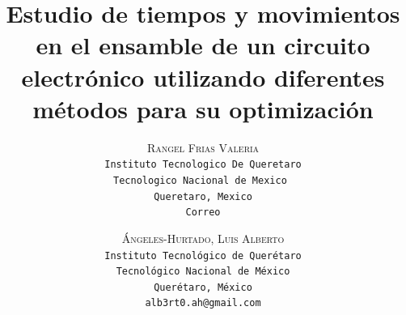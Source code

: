     \lfoot{ \thepage}
    
    \setlength{\droptitle}{-5\baselineskip} %
    \title{\textbf{Estudio de tiempos y movimientos en el ensamble de un circuito electrónico utilizando diferentes métodos para su optimización }} %
    
     \author{ 
     \textsc{Rangel Frias Valeria}\\ 
     \texttt{ Instituto Tecnologico De Queretaro } \\ 
     \texttt{Tecnologico Nacional de Mexico } \\ 
     \texttt{Queretaro, Mexico}\\ 
     \texttt{Correo} 
     \and 
     \textsc{Ángeles-Hurtado, Luis Alberto}\\ 
     \texttt{ Instituto Tecnológico de Querétaro } \\ 
     \texttt{ Tecnológico Nacional de México } \\ 
     \texttt{Querétaro, México}\\ 
     \texttt{alb3rt0.ah@gmail.com} 
    }
    
    
    
    
    \maketitle
    \thispagestyle{fancy}
    
